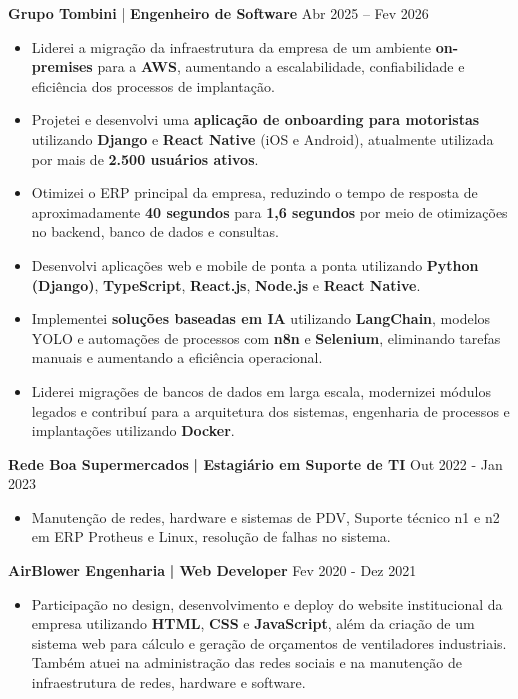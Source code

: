 \textbf{Grupo Tombini} | \textbf{Engenheiro de Software} \hfill Abr 2025 – Fev 2026
\vspace{-3mm}
\begin{itemize} \itemsep -3pt
    \item Liderei a migração da infraestrutura da empresa de um ambiente \textbf{on-premises} para a \textbf{AWS}, aumentando a escalabilidade, confiabilidade e eficiência dos processos de implantação.
    \item Projetei e desenvolvi uma \textbf{aplicação de onboarding para motoristas} utilizando \textbf{Django} e \textbf{React Native} (iOS e Android), atualmente utilizada por mais de \textbf{2.500 usuários ativos}.
    \item Otimizei o ERP principal da empresa, reduzindo o tempo de resposta de aproximadamente \textbf{40 segundos} para \textbf{1,6 segundos} por meio de otimizações no backend, banco de dados e consultas.
    \item Desenvolvi aplicações web e mobile de ponta a ponta utilizando \textbf{Python (Django)}, \textbf{TypeScript}, \textbf{React.js}, \textbf{Node.js} e \textbf{React Native}.
    \item Implementei \textbf{soluções baseadas em IA} utilizando \textbf{LangChain}, modelos YOLO e automações de processos com \textbf{n8n} e \textbf{Selenium}, eliminando tarefas manuais e aumentando a eficiência operacional.
    \item Liderei migrações de bancos de dados em larga escala, modernizei módulos legados e contribuí para a arquitetura dos sistemas, engenharia de processos e implantações utilizando \textbf{Docker}.
\end{itemize}

    \textbf{Rede Boa Supermercados}\textbf{ | Estagiário em Suporte de TI } \hfill  Out 2022 - Jan 2023\\
    \vspace{-3mm}
    \begin{itemize} \itemsep -3pt
        \item Manutenção de redes, hardware e sistemas de PDV, Suporte técnico n1 e n2 em ERP Protheus e Linux, resolução de falhas no sistema.
    \end{itemize}

    \textbf{AirBlower Engenharia}\textbf{ | Web Developer } \hfill  Fev 2020 - Dez 2021\\
    \vspace{-3mm}
    \begin{itemize} \itemsep -3pt
        \item Participação no design, desenvolvimento e deploy do website institucional da empresa utilizando \textbf{HTML}, \textbf{CSS} e \textbf{JavaScript}, além da criação de um sistema web para cálculo e geração de orçamentos de ventiladores industriais. Também atuei na administração das redes sociais e na manutenção de infraestrutura de redes, hardware e software.
    \end{itemize}

